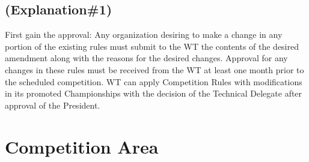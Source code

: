 \documentclass[
]{report}
\begin{document}
\section{(Explanation\#1)}\label{explanation1}

First gain the approval: Any organization desiring to make a change in
any portion of the existing rules must submit to the WT the contents of
the desired amendment along with the reasons for the desired changes.
Approval for any changes in these rules must be received from the WT at
least one month prior to the scheduled competition. WT can apply
Competition Rules with modifications in its promoted Championships with
the decision of the Technical Delegate after approval of the President.

\chapter{Competition Area}\label{competition-area}
\end{document}
